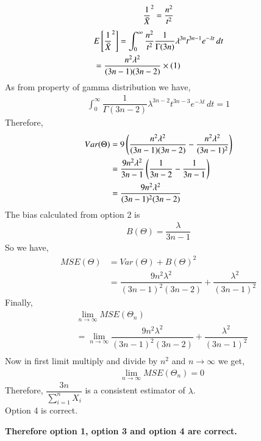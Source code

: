 \documentclass[journal,12pt,twocolumn]{IEEEtran}
\theoremstyle{definition}
\begin{document}
\begin{enumerate}
\begin{align}
      {\dfrac{1}{\Bar{X}}}^2 = \dfrac{n^2}{t^2}
 \end{align}
 \begin{align}
    &  E \left[   {\dfrac{1}{\Bar{X}}}^2  \right] = \int_{0}^{\infty} \dfrac{n^2}{t^2} \dfrac{1}{\Gamma(3n)} \lambda^{3n}t^{3n-1}e^{-\lambda t}\,dt \\
      &= \dfrac{n^2\lambda^2}{(3n-1)(3n-2)} \times (1)
 \end{align}
 As from property of gamma distribution we have,
 \begin{align}
     \int_{0}^{\infty} \dfrac{1}{\Gamma(3n-2)} \lambda^{3n-2}t^{3n-3}e^{-\lambda t}\,dt = 1
 \end{align}
Therefore,
\begin{align}
    Var(\Theta) &= 9\left(\dfrac{n^2\lambda^2}{(3n-1)(3n-2)} - \dfrac{n^2\lambda^2}{(3n-1)^2}\right) \\
    &= \dfrac{9n^2\lambda^2}{3n-1} \left(\dfrac{1}{3n-2}- \dfrac{1}{3n-1}\right) \\
    &= \dfrac{9n^2\lambda^2}{(3n-1)^2(3n-2)}
\end{align}
The bias calculated from option 2 is 
\begin{align}
    B(\Theta) = \dfrac{\lambda}{3n-1}
\end{align}
So we have, 
\begin{align}
    MSE(\Theta) &= Var(\Theta) + B(\Theta)^2 \\
    &= \dfrac{9n^2\lambda^2}{(3n-1)^2(3n-2)} + \dfrac{\lambda^2}{(3n-1)^2}
\end{align}
Finally,
\begin{align}
    & \lim_{n\to\infty} MSE( \Theta_n) \\
     &= \lim_{n\to\infty} \dfrac{9n^2\lambda^2}{(3n-1)^2(3n-2)} + \dfrac{\lambda^2}{(3n-1)^2} \\
\end{align}
Now in first limit multiply and divide by $ n^2$ and $ {n\to\infty} $ we get,
\begin{align}
     & \lim_{n\to\infty} MSE( \Theta_n) =0
\end{align}
Therefore, $\dfrac{3n}{\sum_{i=1}^{n} X_i} $ is a consistent estimator of $ \lambda$. \\
Option 4 is correct. \\
\end{enumerate}
\textbf{Therefore option 1, option 3 and option 4 are correct.}
\end{document}
